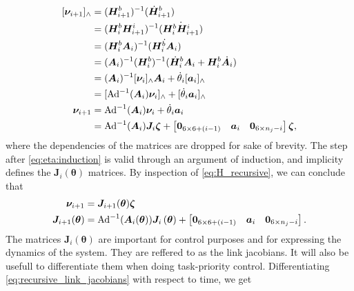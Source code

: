 \begin{subequations}
    \label{eq:H_recursive}
\begin{align}
    [\bm{\nu}_{i+1}]_{\wedge} &= (\bm{H}_{i+1}^b)^{-1}(\dot{\bm{H}}_{i+1}^b) \\
    &= (\bm{H}_{i}^b\bm{H}_{i+1}^i)^{-1}(\dot{\bm{H}_{i}^b\bm{H}_{i+1}^i}) \\
    &= (\bm{H}_{i}^b\bm{A}_i)^{-1}(\dot{\bm{H}_{i}^b\bm{A}_i}) \\
    &= (\bm{A}_i)^{-1}(\bm{H}_{i}^b)^{-1}(\dot{\bm{H}}_{i}^b\bm{A}_i + \bm{H}_{i}^b\dot{\bm{A}}_i) \\
    &= (\bm{A}_i)^{-1}[\bm{\nu}_i]_{\wedge}\bm{A}_i + \dot{\theta}_i[\bm{a}_i]_{\wedge} \\
    &= [\operatorname{Ad}^{-1}(\bm{A}_i)\bm{\nu}_i]_{\wedge} + [\dot{\theta}_i\bm{a}_i]_{\wedge} \label{eq:eta:induction}\\
    \bm{\nu}_{i+1} &= \operatorname{Ad}^{-1}(\bm{A}_i)\bm{\nu}_i + \dot{\theta}_i\bm{a}_i \\
    &= \operatorname{Ad}^{-1}(\bm{A}_i)\bm{J}_i\bm{\zeta} + \begin{bmatrix}\bm{0}_{6\times6+(i-1)} & \bm{a}_i & \bm{0}_{6\times n_j-i}\end{bmatrix}\bm{\zeta},
\end{align}
\end{subequations}
where the dependencies of the matrices are dropped for sake of brevity.
The step after \autoref{eq:eta:induction} is valid through an argument of induction, and
implicity defines the $\bm{J}_i(\bm{\theta})$ matrices.
By inspection of \autoref{eq:H_recursive}, we can conclude that
\begin{subequations}
\begin{align}
    \bm{\nu}_{i+1} &= \bm{J}_{i+1}(\bm{\theta}) \bm{\zeta} \\
    \bm{J}_{i+1}(\bm{\theta}) &= 
    \operatorname{Ad}^{-1}(\bm{A}_i(\bm{\theta}))\bm{J}_i\left(\bm{\theta}\right) + \begin{bmatrix}\bm{0}_{6\times6+(i-1)} & \bm{a}_i & \bm{0}_{6\times n_j-i}\end{bmatrix}.
        \label{eq:recursive_link_jacobians}
\end{align}
\end{subequations}
The matrices $\bm{J}_i(\bm{\theta})$ are important for control purposes and for expressing the 
dynamics of the system. They are reffered to as the link jacobians. It will also 
be usefull to differentiate them when doing task-priority control. Differentiating
\autoref{eq:recursive_link_jacobians} with respect to time, we get
